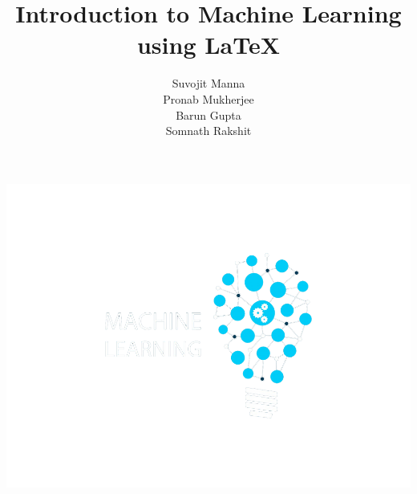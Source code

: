 \documentclass[10pt]{beamer}
\begin{document}
\author[Group 9]{Suvojit Manna\\Pronab Mukherjee\\Barun Gupta\\Somnath Rakshit\\}
\title[Machine Learning]{Introduction to Machine Learning using \LaTeX}


\begingroup
{}
\begin{frame}[plain,t]
\hspace*{-22 mm}
\includegraphics[width=\paperwidth,height=\paperheight]{images/ml_bg}
\end{frame}
\endgroup
\end{document}
